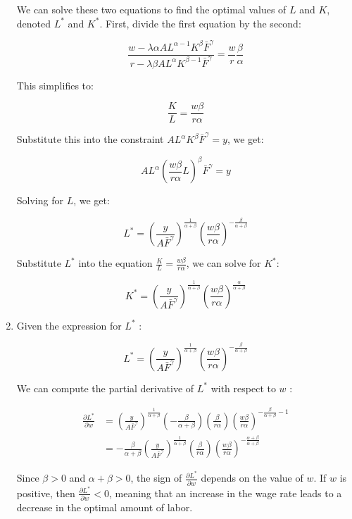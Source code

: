 \documentclass[UTF8,titlepage]{article}
\numberwithin{figure}{section}
\begin{document}
\begin{enumerate}
    We can solve these two equations to find the optimal values of \( L \) and \( K \), denoted \( L^{*} \) and \( K^{*} \).
    First, divide the first equation by the second:
    
    \[
    \frac{w-\lambda \alpha A L^{\alpha-1} K^{\beta} \bar{F}^{\gamma}}{r-\lambda \beta A L^{\alpha} K^{\beta-1} \bar{F}^{\gamma}}=\frac{w}{r} \frac{\beta}{\alpha}
    \]
    
    This simplifies to:
    
    \[
    \frac{K}{L}=\frac{w \beta}{r \alpha}
    \]
    
    Substitute this into the constraint \( A L^{\alpha} K^{\beta} \bar{F}^{\gamma}=y \), we get:
    
    \[
    A L^{\alpha}\left(\frac{w \beta}{r \alpha} L\right)^{\beta} \bar{F}^{\gamma}=y
    \]
    
    Solving for \( L \), we get:
    
    \[
    L^{*}=\left(\frac{y}{A\bar{F}^{\gamma}}\right)^{\frac{1}{\alpha+\beta}}\left(\frac{w \beta}{r \alpha}\right)^{-\frac{\beta}{\alpha+\beta}}
    \]
    
    Substitute \( L^{*} \) into the equation \( \frac{K}{L}=\frac{w \beta}{r \alpha} \), we can solve for \( K^{*} \):
    
    \[
    K^{*}=\left(\frac{y}{A\bar{F}^{\gamma}}\right)^{\frac{1}{\alpha+\beta}}\left(\frac{w \beta}{r \alpha}\right)^{\frac{\alpha}{\alpha+\beta}}
    \]
    \item Given the expression for \( L^{*} \) :

\[
L^{*}=\left(\frac{y}{A\bar{F}^{\gamma}}\right)^{\frac{1}{\alpha+\beta}}\left(\frac{w \beta}{r \alpha}\right)^{-\frac{\beta}{\alpha+\beta}}
\]

We can compute the partial derivative of \( L^{*} \) with respect to \( w \) :

\begin{align*}
\frac{\partial L^{*}}{\partial w} & =\left(\frac{y}{A\bar{F}^{\gamma}}\right)^{\frac{1}{\alpha+\beta}}\left(-\frac{\beta}{\alpha+\beta}\right)\left(\frac{\beta}{r \alpha}\right)\left(\frac{w \beta}{r \alpha}\right)^{-\frac{\beta}{\alpha+\beta}-1} \\
& =-\frac{\beta}{\alpha+\beta}\left(\frac{y}{A\bar{F}^{\gamma}}\right)^{\frac{1}{\alpha+\beta}}\left(\frac{\beta}{r \alpha}\right)\left(\frac{w \beta}{r \alpha}\right)^{-\frac{\alpha+\beta}{\alpha+\beta}}
\end{align*}

Since \( \beta>0 \) and \( \alpha+\beta>0 \), the sign of \( \frac{\partial L^{*}}{\partial w} \) depends on the value of \( w \). If \( w \) is positive, then \( \frac{\partial L^{*}}{\partial w}<0 \), meaning that an increase in the wage rate leads to a decrease in the optimal amount of labor. 


\end{enumerate}
\end{document}
